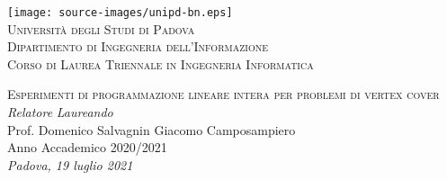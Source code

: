 \documentclass[a4paper,12pt]{book}
\begin{document}
\begin{titlepage}

	\begin{center}
	
	\texttt{[image: source-images/unipd-bn.eps]} \\ %
	\vspace{0.4cm}
	\textsc{\LARGE Università degli Studi di Padova}\\
	\vspace{0.25cm}
	\textsc{\normalsize Dipartimento di Ingegneria dell'Informazione}\\
	\vspace{0.25cm}
	\textsc{\normalsize Corso di Laurea Triennale in Ingegneria Informatica}
	
	\vfill
	\textsc{\LARGE Esperimenti di programmazione lineare intera per problemi di vertex cover}\\

	\vfill
	\vspace*{4cm}
	\textit{\large Relatore} \hfill \textit{\large Laureando}\\
	\large Prof. Domenico Salvagnin \hfill Giacomo Camposampiero\\
	
	\vfill
	{\large Anno Accademico 2020/2021}\\
	\textit{\large Padova, 19 luglio 2021}
	\end{center}
\end{titlepage}


\thispagestyle{empty} %
\cleardoublepage

\thispagestyle{empty}

\clearpage{\pagestyle{plain}\cleardoublepage}


\clearpage{\pagestyle{plain}\cleardoublepage}
\tableofcontents %

\clearpage{\pagestyle{plain}\cleardoublepage} %

\clearpage{\pagestyle{plain}\cleardoublepage} %
\end{document}
